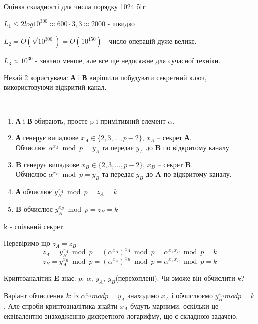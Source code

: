 \begin{example}Оцінка складності для числа порядку 1024 біт:

$L_1  \leq 2log10^{300}\approx 600 \cdot 3,3 \approx 2000$ - швидко

$L_2 = O(\sqrt{10^{300}}) = O(10^{150})$ - число операцій дуже велике.

$L_3 \approx 10^{30}$ - значно менше, але все ще недосяжне для сучасної техніки.
\end{example}

Нехай 2 користувача: \textbf{А} і \textbf{В} вирішили побудувати секретний ключ, використовуючи відкритий канал.

\begin{algorithm}\

\begin{enumerate}

\item \textbf{А} і \textbf{В} обирають, просте p і примітивний елемент $\alpha$.

\item \textbf{А} генерує випадкове $x_A \in \{2,3, \dots, p-2\}$, $x_A$  – секрет \textbf{А}.\\
Обчислює $\alpha ^{x_A} \bmod p = y_A$ та передає $y_A$ до \textbf{B} по відкритому каналу.

\item \textbf{B} генерує випадкове $x_B \in \{2,3, \dots, p-2\}$, $x_B$  – секрет \textbf{B}.\\
Обчислює $\alpha ^{x_B} \bmod p = y_B$ та передає $y_B$ до \textbf{A} по відкритому каналу.

\item \textbf{А} обчислює $y_B^{x_A} \bmod p = z_A = k$

\item \textbf{B} обчислює $y_A^{x_B} \bmod p = z_B = k$
\end{enumerate}
k - спільний секрет.

\end{algorithm}
Перевіримо що $z_A=z_B$
\[ z_A = y_B^{x_A} \bmod p = (\alpha ^{x_B})^{x_A} \bmod p = \alpha ^{x_Ax_B} \bmod p = k \]
\[ z_B = y_A^{x_B} \bmod p = (\alpha ^{x_A})^{x_B} \bmod p = \alpha ^{x_Ax_B} \bmod p = k \]

Криптоаналітик \textbf{E} знає: $p,\ \alpha,\ y_A,\ y_B$(перехоплені). Чи зможе він обчислити $k$?

Варіант обчислення $k$: із $\alpha ^{x_A} mod p = y_A $ знаходимо $x_A$ і обчислюємо $y_B^{x_A} mod p = k$.
Але спроби криптоаналітика знайти $x_A$ будуть марними, оскільки це еквівалентно знаходженню дискретного логарифму, що є складною задачею.

